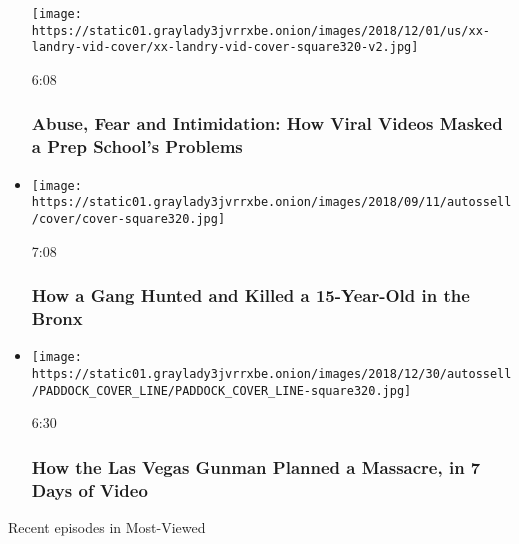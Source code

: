 \begin{itemize}
  \texttt{[image: https://static01.graylady3jvrrxbe.onion/images/2018/12/01/us/xx-landry-vid-cover/xx-landry-vid-cover-square320-v2.jpg]}

  6:08

  \hypertarget{abuse-fear-and-intimidation-how-viral-videos-masked-a-prep-schools-problems}{%
  \subsubsection{Abuse, Fear and Intimidation: How Viral Videos Masked a
  Prep School's
  Problems}\label{abuse-fear-and-intimidation-how-viral-videos-masked-a-prep-schools-problems}}
\item
  \href{https://www.nytimes3xbfgragh.onion/video/nyregion/100000005990101/junior-murder-bronx-trinitarios.html?action=click\&module=video-series-bar\&region=header\&pgtype=Article\&playlistId=video/Most-Viewed}{}

  \texttt{[image: https://static01.graylady3jvrrxbe.onion/images/2018/09/11/autossell/cover/cover-square320.jpg]}

  7:08

  \hypertarget{how-a-gang-hunted-and-killed-a-15-year-old-in-the-bronx}{%
  \subsubsection{How a Gang Hunted and Killed a 15-Year-Old in the
  Bronx}\label{how-a-gang-hunted-and-killed-a-15-year-old-in-the-bronx}}
\item
  \href{https://www.nytimes3xbfgragh.onion/video/us/100000005794914/las-vegas-gunman-planned-massacre.html?action=click\&module=video-series-bar\&region=header\&pgtype=Article\&playlistId=video/Most-Viewed}{}

  \texttt{[image: https://static01.graylady3jvrrxbe.onion/images/2018/12/30/autossell/PADDOCK\_COVER\_LINE/PADDOCK\_COVER\_LINE-square320.jpg]}

  6:30

  \hypertarget{how-the-las-vegas-gunman-planned-a-massacre-in-7-days-of-video}{%
  \subsubsection{How the Las Vegas Gunman Planned a Massacre, in 7 Days
  of
  Video}\label{how-the-las-vegas-gunman-planned-a-massacre-in-7-days-of-video}}
\end{itemize}

Recent episodes in Most-Viewed

